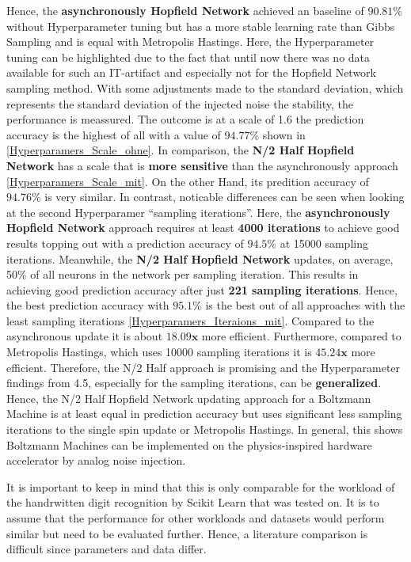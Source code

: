 Hence, the \textbf{asynchronously Hopfield Network} achieved an baseline of \(\mathbf{90.81\%}\) without Hyperparameter tuning but has a more stable  learning rate than Gibbs Sampling and
is equal with Metropolis Hastings.
Here, the Hyperparameter tuning can be highlighted due to the fact that until now there was no data available for such an \ac{IT}-artifact and especially not for the Hopfield Network sampling method.
With some adjustments made to the standard deviation, which represents the standard deviation of the injected noise the stability, the performance is meassured.
The outcome is at a scale of 1.6 the prediction accuracy is the highest of all with a value of \(\mathbf{94.77\%}\) shown in \ref{Hyperparamers_Scale_ohne}.
In comparison, the \textbf{N/2 Half Hopfield Network} has a scale that is \textbf{more sensitive} than the asynchronously approach \ref{Hyperparamers_Scale_mit}.
On the other Hand, its predition accuracy of \(\mathbf{94.76\%}\) is very similar.
In contrast, noticable differences can be seen when looking at the second Hyperparamer ``sampling iterations''. 
Here, the \textbf{asynchronously Hopfield Network} approach requires at least \textbf{4000 iterations} to achieve good results topping out with
a prediction accuracy of \(\mathbf{94.5\%}\) at 15000 sampling iterations. 
Meanwhile, the \textbf{N/2 Half Hopfield Network} updates, on average, 50\% of all neurons in the network per sampling iteration.
This results in achieving good prediction accuracy after just \textbf{221 sampling iterations}.
Hence, the best prediction accuracy with \(\mathbf{95.1\%}\) is the best out of all approaches with the least sampling iterations \ref{Hyperparamers_Iteraions_mit}.
Compared to the asynchronous update it is about \(\mathbf{18.09x}\) more efficient. 
Furthermore, compared to Metropolis Hastings, which uses 10000 sampling iterations it is \(\mathbf{45.24x}\) more efficient.
Therefore, the N/2 Half approach is promising and the Hyperparameter findings from 4.5, especially for the sampling iterations, can be \textbf{generalized}.
Hence, the N/2 Half Hopfield Network updating approach for a Boltzmann Machine is at least equal in prediction accuracy but uses significant less sampling iterations to the single spin update or Metropolis Hastings.
In general, this shows Boltzmann Machines can be implemented on the physics-inspired hardware accelerator by analog noise injection. 

It is important to keep in mind that this is only comparable for the workload of the handrwitten digit recognition by Scikit Learn that was tested on. 
It is to assume that the performance for other workloads and datasets would perform similar but need to be evaluated further. 
Hence, a literature comparison is difficult since parameters and data differ. 

